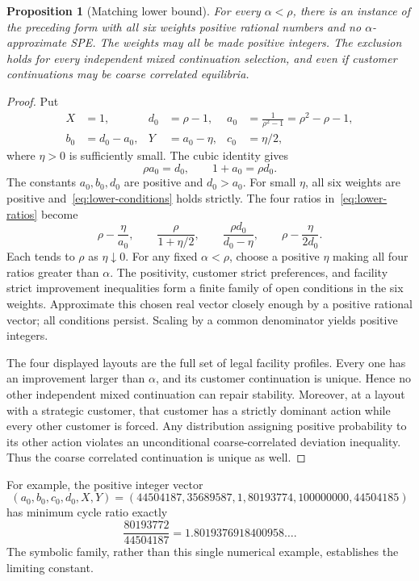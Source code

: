 \documentclass[11pt]{article}
\newtheorem{proposition}[theorem]{Proposition}
\theoremstyle{definition}
\theoremstyle{remark}
\newcommand{\rhoG}{\rho}
\begin{document}
\begin{proposition}[Matching lower bound]\label{prop:lower}
For every $\alpha<\rhoG$, there is an instance of the preceding form with all six weights positive rational numbers and no $\alpha$-approximate SPE. The weights may all be made positive integers. The exclusion holds for every independent mixed continuation selection, and even if customer continuations may be coarse correlated equilibria.
\end{proposition}
\begin{proof}
Put
\begin{align*}
 X&=1,& d_0&=\rhoG-1,&
 a_0&=\frac1{\rhoG^2-1}=\rhoG^2-\rhoG-1,\\
 b_0&=d_0-a_0,& Y&=a_0-\eta,& c_0&=\eta/2,
\end{align*}
where $\eta>0$ is sufficiently small. The cubic identity gives
\[
 \rhoG a_0=d_0,\qquad 1+a_0=\rhoG d_0.
\]
The constants $a_0,b_0,d_0$ are positive and $d_0>a_0$. For small $\eta$, all six weights are positive and~\eqref{eq:lower-conditions} holds strictly. The four ratios in~\eqref{eq:lower-ratios} become
\[
 \rhoG-\frac{\eta}{a_0},\qquad
 \frac{\rhoG}{1+\eta/2},\qquad
 \frac{\rhoG d_0}{d_0-\eta},\qquad
 \rhoG-\frac{\eta}{2d_0}.
\]
Each tends to $\rhoG$ as $\eta\downarrow0$. For any fixed $\alpha<\rhoG$, choose a positive $\eta$ making all four ratios greater than $\alpha$. The positivity, customer strict preferences, and facility strict improvement inequalities form a finite family of open conditions in the six weights. Approximate this chosen real vector closely enough by a positive rational vector; all conditions persist. Scaling by a common denominator yields positive integers.

The four displayed layouts are the full set of legal facility profiles. Every one has an improvement larger than $\alpha$, and its customer continuation is unique. Hence no other independent mixed continuation can repair stability. Moreover, at a layout with a strategic customer, that customer has a strictly dominant action while every other customer is forced. Any distribution assigning positive probability to its other action violates an unconditional coarse-correlated deviation inequality. Thus the coarse correlated continuation is unique as well.
\end{proof}

For example, the positive integer vector
\[
 (a_0,b_0,c_0,d_0,X,Y)
 =(44504187,35689587,1,80193774,100000000,44504185)
\]
has minimum cycle ratio exactly
\[
 \frac{80193772}{44504187}=1.8019376918400958\ldots.
\]
The symbolic family, rather than this single numerical example, establishes the limiting constant.
\end{document}
